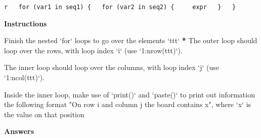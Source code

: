\documentclass[]{article}
\newcommand{\hlstr}[1]{\textcolor[rgb]{0.251,0.627,0.251}{#1}}%
\newcommand{\hlstd}[1]{\textcolor[rgb]{0.251,0.251,0.251}{#1}}%
\newcommand{\hlkwc}[1]{\textcolor[rgb]{0.251,0.251,0.251}{#1}}%
\newenvironment{Shaded}{\begin{myshaded}}{\end{myshaded}}
\newcommand{\DataTypeTok}[1]{\hlkwc{#1}}
\newcommand{\StringTok}[1]{\hlstr{#1}}
\newcommand{\ErrorTok}[1]{\textbf{{#1}}}
\newcommand{\NormalTok}[1]{\hlstd{#1}}
\begin{document}
\texttt{r\ \ \ for\ (var1\ in\ seq1)\ \{\ \ \ for\ (var2\ in\ seq2)\ \{\ \ \ \ \ expr\ \ \ \}\ \ \ \}}

\textbf{Instructions}

\begin{Shaded}
\begin{Highlighting}[]
\NormalTok{Finish the nested }\StringTok{`}\DataTypeTok{for}\StringTok{`}\NormalTok{ loops to go over the elements } \StringTok{`}\DataTypeTok{ttt}\StringTok{`}\OperatorTok{:}
\StringTok{  }
\StringTok{  }\ErrorTok{*}\StringTok{ }\NormalTok{The outer loop should loop over the rows, with loop index }\StringTok{`}\DataTypeTok{i}\StringTok{`}\NormalTok{ (use }\StringTok{`}\DataTypeTok{1:nrow(ttt)}\StringTok{`}\NormalTok{).}

\OperatorTok{*}\StringTok{ }\NormalTok{The inner loop should loop over the columns, with loop index }\StringTok{`}\DataTypeTok{j}\StringTok{`}\NormalTok{ (use }\StringTok{`}\DataTypeTok{1:ncol(ttt)}\StringTok{`}\NormalTok{).}

\OperatorTok{*}\StringTok{ }\NormalTok{Inside the inner loop, make use of }\StringTok{`}\DataTypeTok{print()}\StringTok{`}\NormalTok{ and }\StringTok{`}\DataTypeTok{paste()}\StringTok{`}\NormalTok{ to print out information }\NormalTok{ the following format}\OperatorTok{:}\StringTok{ "On row i and column j the board contains x"}\NormalTok{, where }\StringTok{`}\DataTypeTok{x}\StringTok{`}\NormalTok{ is the value on that position}
\end{Highlighting}
\end{Shaded}

\textbf{Answers}
\end{document}
